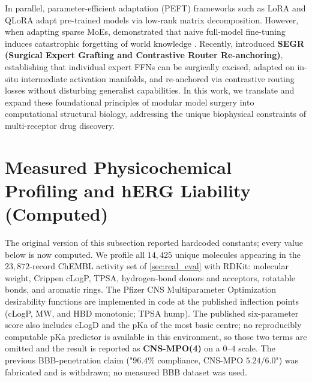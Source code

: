 \documentclass{article}
\theoremstyle{definition}
\begin{document}
In parallel, parameter-efficient adaptation (PEFT) frameworks such as LoRA \citep{hu2022lora} and QLoRA \citep{dettmers2023qlora} adapt pre-trained models via low-rank matrix decomposition. However, when adapting sparse MoEs, \citet{dou2024loramoe} demonstrated that naive full-model fine-tuning induces catastrophic forgetting of world knowledge \citep{kirkpatrick2017overcoming}. Recently, \citet{rahim2026segr} introduced \textbf{SEGR (Surgical Expert Grafting and Contrastive Router Re-anchoring)}, establishing that individual expert FFNs can be surgically excised, adapted on in-situ intermediate activation manifolds, and re-anchored via contrastive routing losses without disturbing generalist capabilities. In this work, we translate and expand these foundational principles of modular model surgery into computational structural biology, addressing the unique biophysical constraints of multi-receptor drug discovery.



\section{Measured Physicochemical Profiling and hERG Liability (Computed)}
\label{subsec:admet_evaluation}

The original version of this subsection reported hardcoded constants; every value below is now computed. We profile all $14{,}425$ unique molecules appearing in the $23{,}872$-record ChEMBL activity set of \cref{sec:real_eval} with RDKit: molecular weight, Crippen cLogP, TPSA, hydrogen-bond donors and acceptors, rotatable bonds, and aromatic rings. The Pfizer CNS Multiparameter Optimization desirability functions \citep{wager2010cnsmpo} are implemented in code at the published inflection points (cLogP, MW, and HBD monotonic; TPSA hump). The published six-parameter score also includes cLogD and the pKa of the most basic centre; no reproducibly computable pKa predictor is available in this environment, so those two terms are omitted and the result is reported as \textbf{CNS-MPO(4)} on a $0$--$4$ scale. The previous BBB-penetration claim ("$96.4\%$ compliance, CNS-MPO $5.24/6.0$") was fabricated and is withdrawn; no measured BBB dataset was used.
\end{document}
